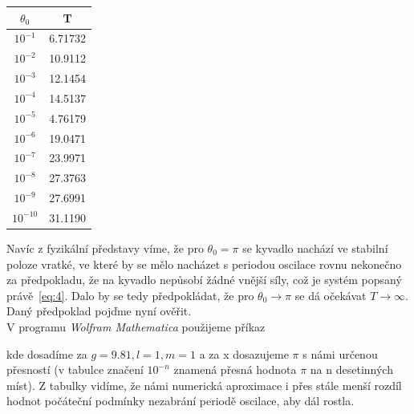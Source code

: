\documentclass[reqno, a4paper]{amsart}
\begin{document}
		\begin{table}
			\begin{minipage}{\textwidth}
				\begin{minipage}[b]{0.25\textwidth}
					\centering
					\begin{tabular}{|c|c|}
						\hline
						$\theta_{0}$ & T \\ 
						\hline
						$ 10^{-1} $& 6.71732\\$ 10^{-2} $& 10.9112\\$ 10^{-3} $& 12.1454\\$ 10^{-4} $& 14.5137\\$ 10^{-5} $& 4.76179\\$ 10^{-6} $& 19.0471\\$ 10^{-7} $& 23.9971\\$ 10^{-8} $& 27.3763\\$ 10^{-9} $& 27.6991\\$ 10^{-10} $& 31.1190\\
						\hline
					\end{tabular}
				\end{minipage}
			\end{minipage}
		\end{table}
		Navíc z fyzikální představy víme, že pro $\theta_{0}=\pi$ se kyvadlo nachází ve stabilní poloze vratké, ve které by se mělo nacházet s periodou oscilace rovnu nekonečno za předpokladu, že na kyvadlo nepůsobí žádné vnější síly, což je systém popsaný právě~\eqref{eq:4}.
		Dalo by se tedy předpokládat, že pro $\theta_{0} \longrightarrow \pi$ se dá očekávat $T\longrightarrow \infty $. Daný předpoklad pojďme nyní ověřit.\\
		V programu \textit{Wolfram Mathematica} použijeme příkaz
		\begin{verbatim*}
			
			NDSolve[{(g*Sin[y[t]])/l+(y^\[Prime]\[Prime])[t]==0, 
				Derivative[1][y][0]==0,y[0]==x,WhenEvent[y[t]==0,{Print[t],
					"StopIntegration"}]},y,{t,0,50}],
			
		\end{verbatim*}
		kde dosadíme za $ g=9.81, l=1, m=1$  a za x dosazujeme $ \pi $ s námi určenou přesností (v tabulce značení $ 10^{-n} $ znamená přesná hodnota $ \pi $ na n desetinných míst).
		Z tabulky vidíme, že námi numerická aproximace i přes stále menší rozdíl hodnot počáteční podmínky nezabrání periodě oscilace, aby dál rostla. \\
		\\
		
\end{document}
